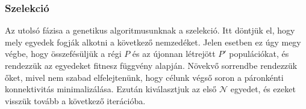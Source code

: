 \subsubsection{Szelekció}
Az utolsó fázisa a genetikus algoritmusunknak a szelekció.
Itt döntjük el, hogy mely egyedek fogják alkotni a következő nemzedéket.
Jelen esetben ez úgy megy végbe, hogy összefésüljük a régi $P$ és az újonnan létrejött $P'$ populációkat,
és rendezzük az egyedeket  fitnesz függvény alapján.
Növekvő sorrendbe rendezzük őket, mivel nem szabad elfelejtenünk, hogy célunk végső soron a páronkénti konnektivitás minimalizálása.
Ezután kiválasztjuk az első $\mathcal{N}$ egyedet, és ezeket visszük tovább a következő iterációba.
